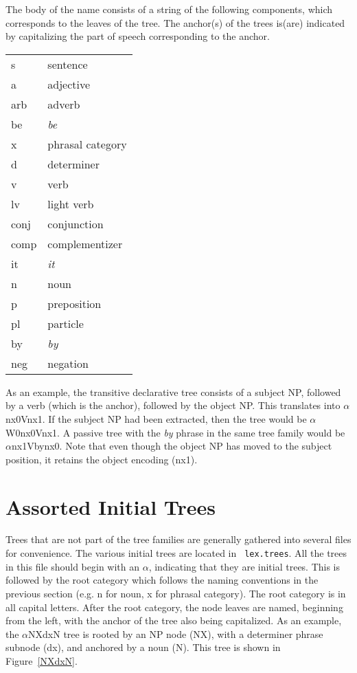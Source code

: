 \noindent The body of the name consists of a string of the following 
components, which corresponds to the leaves of the tree.  The anchor(s) of the
trees is(are) indicated by capitalizing the part of speech corresponding to the
anchor.

\begin{description}
\item\begin{tabular}{ll}
s&sentence\\
a&adjective\\
arb&adverb\\
be&{\it be}\\
x&phrasal category\\
d&determiner\\
v&verb\\
lv&light verb\\
conj&conjunction\\
comp&complementizer\\
it&{\it it}\\
n&noun\\
p&preposition\\
pl&particle\\
by&{\it by}\\
neg&negation\\
\end{tabular}
\end{description}

\noindent As an example, the transitive declarative tree consists of a subject
NP, followed by a verb (which is the anchor), followed by the object NP.  This
translates into $\alpha$nx0Vnx1.  If the subject NP had been extracted, then
the tree would be $\alpha$W0nx0Vnx1.  A passive tree with the {\it by} phrase
in the same tree family would be $\alpha$nx1Vbynx0.  Note that even though the
object NP has moved to the subject position, it retains the object encoding
(nx1).

\section{Assorted Initial Trees}

Trees that are not part of the tree families are generally gathered into
several files for convenience.  The various initial trees are located in {\tt
lex.trees}.  All the trees in this file should begin with an $\alpha$,
indicating that they are initial trees.  This is followed by the root category
which follows the naming conventions in the previous section (e.g. n for noun,
x for phrasal category).  The root category is in all capital letters.  After
the root category, the node leaves are named, beginning from the left, with the
anchor of the tree also being capitalized.  As an example, the $\alpha$NXdxN
tree is rooted by an NP node (NX), with a determiner phrase subnode (dx), and
anchored by a noun (N).  This tree is shown in Figure~\ref{NXdxN}.

